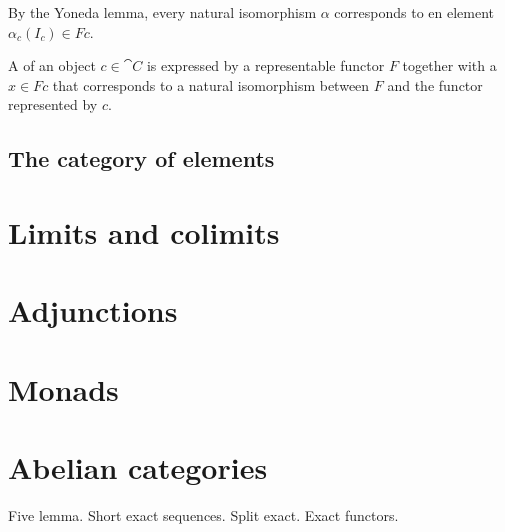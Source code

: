 By the Yoneda lemma, every natural isomorphism $\alpha$ corresponds to en element $\alpha_c(I_c) \in Fc$.
\begin{definition}
A  of an object $c\in \cat{C}$ is expressed by a representable functor $F$ together with a  $x\in Fc$ that corresponds to a natural isomorphism between $F$ and the functor represented by $c$.
\end{definition}
\section{The category of elements}
\chapter{Limits and colimits}
\chapter{Adjunctions}
\chapter{Monads}

\chapter{Abelian categories}
Five lemma. Short exact sequences. Split exact. Exact functors.